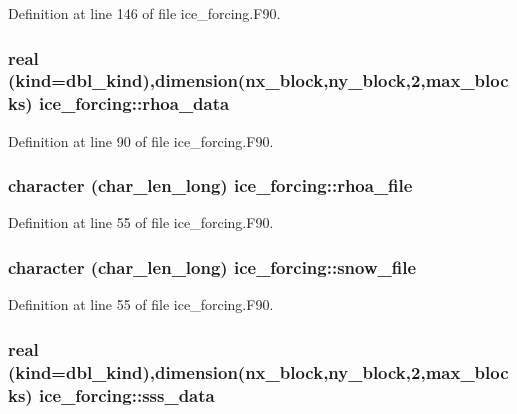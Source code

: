 Definition at line 146 of file ice\_\-forcing.F90.\hypertarget{namespaceice__forcing_ab950a2df7e588896b30862fc06c54496}{
\subsubsection[{rhoa\_\-data}]{\setlength{\rightskip}{0pt plus 5cm}real (kind=dbl\_\-kind),dimension(nx\_\-block,ny\_\-block,2,max\_\-blocks) {\bf ice\_\-forcing::rhoa\_\-data}}}
\label{namespaceice__forcing_ab950a2df7e588896b30862fc06c54496}


Definition at line 90 of file ice\_\-forcing.F90.\hypertarget{namespaceice__forcing_a91b13032a46cf179bc526aaacf04608d}{
\subsubsection[{rhoa\_\-file}]{\setlength{\rightskip}{0pt plus 5cm}character (char\_\-len\_\-long) {\bf ice\_\-forcing::rhoa\_\-file}}}
\label{namespaceice__forcing_a91b13032a46cf179bc526aaacf04608d}


Definition at line 55 of file ice\_\-forcing.F90.\hypertarget{namespaceice__forcing_aa253506c47f71090fd11a5b309eecf7e}{
\subsubsection[{snow\_\-file}]{\setlength{\rightskip}{0pt plus 5cm}character (char\_\-len\_\-long) {\bf ice\_\-forcing::snow\_\-file}}}
\label{namespaceice__forcing_aa253506c47f71090fd11a5b309eecf7e}


Definition at line 55 of file ice\_\-forcing.F90.\hypertarget{namespaceice__forcing_afc0212ff56f8450191bde0697eec98c0}{
\subsubsection[{sss\_\-data}]{\setlength{\rightskip}{0pt plus 5cm}real (kind=dbl\_\-kind),dimension(nx\_\-block,ny\_\-block,2,max\_\-blocks) {\bf ice\_\-forcing::sss\_\-data}}}
\label{namespaceice__forcing_afc0212ff56f8450191bde0697eec98c0}


